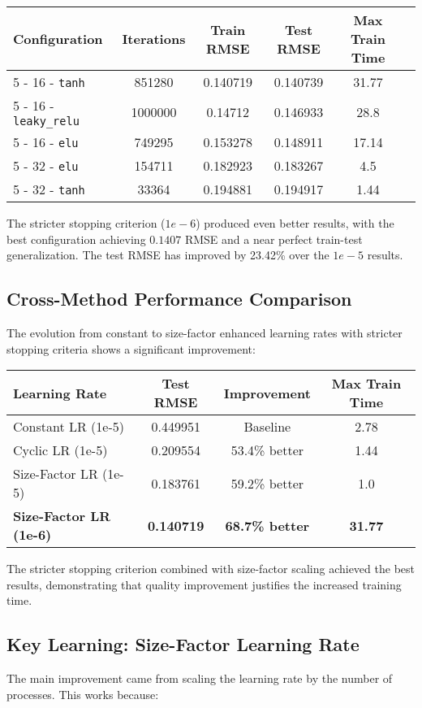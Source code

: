\documentclass{article}
\begin{document}
\begin{center}
\begin{tabular}{|l|c|c|c|c|c|}
\hline
Configuration & Iterations & Train RMSE & Test RMSE & Max Train Time \\
\hline
5 - 16 - \verb|tanh| & 851280 & 0.140719 & 0.140739 & 31.77 \\
5 - 16 - \verb|leaky_relu| & 1000000 & 0.14712 & 0.146933 & 28.8 \\
5 - 16 - \verb|elu| & 749295 & 0.153278 & 0.148911 & 17.14 \\
5 - 32 - \verb|elu| & 154711 & 0.182923 & 0.183267 & 4.5 \\
5 - 32 - \verb|tanh| & 33364 & 0.194881 & 0.194917 & 1.44 \\
\hline
\end{tabular}
\end{center}

The stricter stopping criterion ($1e-6$) produced even better results, with the best configuration achieving $0.1407$ RMSE and a near perfect train-test generalization. The test RMSE has improved by 23.42\% over the $1e-5$ results.

\subsection{Cross-Method Performance Comparison}
The evolution from constant to size-factor enhanced learning rates with stricter stopping criteria shows a significant improvement:

\begin{center}
\begin{tabular}{|l|c|c|c|}
\hline
Learning Rate & Test RMSE & Improvement & Max Train Time\\
\hline
Constant LR (1e-5) & 0.449951 & Baseline & 2.78 \\
Cyclic LR (1e-5) & 0.209554 & 53.4\% better & 1.44 \\
Size-Factor LR (1e-5) & 0.183761 & 59.2\% better & 1.0 \\
\textbf{Size-Factor LR (1e-6)} & \textbf{0.140719} & \textbf{68.7\% better} & \textbf{31.77} \\
\hline
\end{tabular}
\end{center}

The stricter stopping criterion combined with size-factor scaling achieved the best results, demonstrating that quality improvement justifies the increased training time.

\subsection{Key Learning: Size-Factor Learning Rate}
The main improvement came from scaling the learning rate by the number of processes. This works because:
\end{document}
